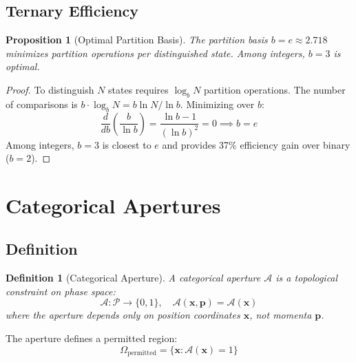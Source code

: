 \documentclass[twocolumn,amsmath,amssymb,aps,prl,superscriptaddress]{revtex4-2}
\newtheorem{proposition}[theorem]{Proposition}
\newtheorem{definition}[theorem]{Definition}
\newcommand{\Pspace}{\mathcal{P}}
\newcommand{\Apert}{\mathcal{A}}
\begin{document}
\subsection{Ternary Efficiency}

\begin{proposition}[Optimal Partition Basis]
The partition basis $b = e \approx 2.718$ minimizes partition operations per distinguished state. Among integers, $b = 3$ is optimal.
\end{proposition}

\begin{proof}
To distinguish $N$ states requires $\log_b N$ partition operations. The number of comparisons is $b \cdot \log_b N = b \ln N / \ln b$. Minimizing over $b$:
\begin{equation}
\frac{d}{db}\left(\frac{b}{\ln b}\right) = \frac{\ln b - 1}{(\ln b)^2} = 0 \implies b = e
\end{equation}
Among integers, $b = 3$ is closest to $e$ and provides 37\% efficiency gain over binary ($b = 2$).
\end{proof}

\section{Categorical Apertures}
\label{sec:aperture}

\subsection{Definition}

\begin{definition}[Categorical Aperture]
\label{def:aperture}
A categorical aperture $\Apert$ is a topological constraint on phase space:
\begin{equation}
\Apert: \Pspace \to \{0, 1\}, \quad \Apert(\mathbf{x}, \mathbf{p}) = \Apert(\mathbf{x})
\end{equation}
where the aperture depends \emph{only} on position coordinates $\mathbf{x}$, not momenta $\mathbf{p}$.
\end{definition}

The aperture defines a permitted region:
\begin{equation}
\Omega_{\text{permitted}} = \{\mathbf{x} : \Apert(\mathbf{x}) = 1\}
\end{equation}
\end{document}
